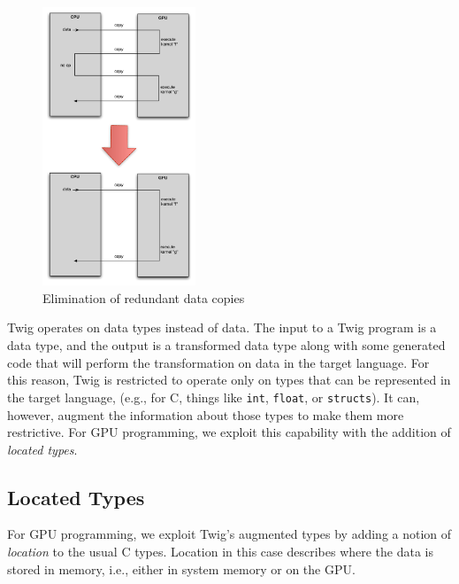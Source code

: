 \begin{figure}[ht]
\label{basic-idea}
\begin{center}
\includegraphics[width=1.8in]{images/basic-idea}
\caption{Elimination of redundant data copies}
\end{center}
\end{figure}

Twig operates on data types instead of data. The input to a Twig program is a
data type, and the output is a transformed data type along with some generated
code that will perform the transformation on data in the target language. For
this reason, Twig is restricted to operate only on types that can be represented
in the target language, (e.g., for C, things like \texttt{int}, \texttt{float},
or \texttt{structs}). It can, however, augment the information about those types
to make them more restrictive. For GPU programming, we exploit this capability
with the addition of \emph{located types}.

\subsection{Located Types}
\label{sec:located-types}


For GPU programming, we exploit Twig's augmented types by adding a notion of
\emph{location} to the usual C types. Location in this case describes where the
data is stored in memory, i.e., either in system memory or on the GPU.


